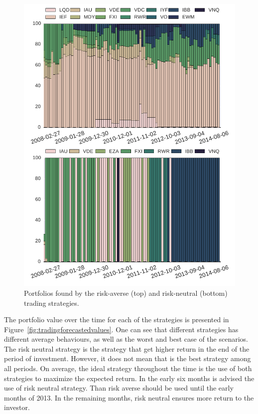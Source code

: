 \begin{figure}[tp]
\centering
\includegraphics{../pic/trading_portfolio.pdf}
\caption{Portfolios found by the risk-averse (top) and risk-neutral (bottom) trading strategies.}
\label{fig:tradingportfolios}
\end{figure}

The portfolio value over the time for each of the strategies is presented in Figure~\ref{fig:tradingforecastedvalues}.
One can see that different strategies has different average behaviours, as well as the worst and best case of the scenarios.
The risk neutral strategy is the strategy that get higher return in the end of the period of investment. 
However, it does not mean that is the best strategy among all periods.
On average, the ideal strategy throughout the time is the use of both strategies to maximize the expected return.
In the early six months is advised the use of risk neutral strategy.
Than risk averse should be used until the early months of 2013.
In the remaining months, risk neutral ensures more return to the investor.

